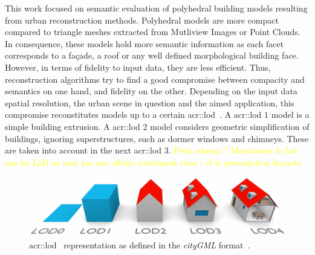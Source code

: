 \documentclass[runningheads]{llncs}
\begin{document}
	This work focused on semantic evaluation of polyhedral building models resulting from urban reconstruction methods. Polyhedral models are more compact compared to triangle meshes extracted from Mutliview Images or Point Clouds. In consequence, these models hold more semantic information as each facet corresponds to a fa\c{c}ade, a roof or any well defined morphological building face. However, in terms of fidelity to input data, they are less efficient. Thus, reconstruction algorithms try to find a good compromise between compacity and semantics on one hand, and fidelity on the other. Depending on the input data spatial resolution, the urban scene in question and the aimed application, this compromise reconstitutes models up to a certain \acrfull{acr::lod}~\cite{kolbe2005citygml}. A \acrshort{acr::lod} $1$ model is a simple building extrusion. A \acrshort{acr::lod} $2$ model considers geometric simplification of buildings, ignoring superstructures, such as dormer windows and chimneys. These are taken into account in the next \acrshort{acr::lod} $3$. \textcolor{yellow}{Petit schema ? Mentionner le fait que les LoD ne sont pas une affaire totalement close : cf la presentation keynote}\\
	\begin{figure}[H]
		\begin{center}
			\includegraphics[width=\textwidth]{images/citygml_lod}
			\caption{\label{fig::lods_citygml} \acrshort{acr::lod}~\cite{kolbe2005citygml} representation as defined in the \emph{cityGML} format~\cite{ohori2016higher}.}
		\end{center}
	\end{figure}
	
\end{document}
